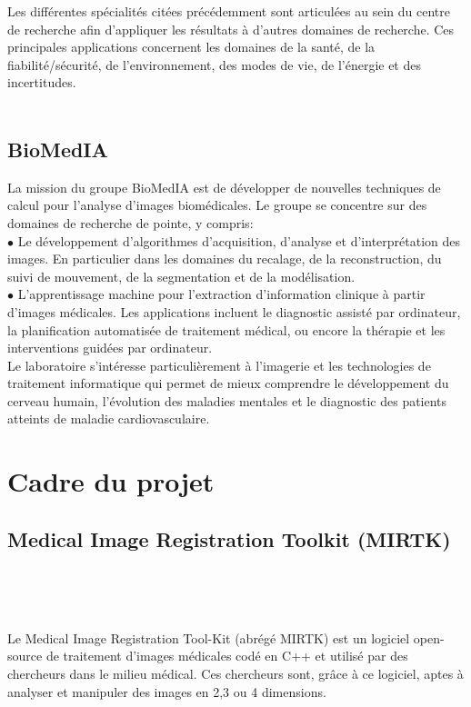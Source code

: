 \documentclass[10pt]{report}
\begin{document}
	Les différentes spécialités citées précédemment sont articulées au sein du centre de recherche afin d'appliquer les résultats à d'autres domaines de recherche. Ces principales applications concernent les domaines de la santé, de la fiabilité/sécurité, de l'environnement, des modes de vie, de l'énergie et des incertitudes.
	\\
	\\
	\subsection{BioMedIA}
	
	La mission du groupe BioMedIA est de développer de nouvelles techniques de
	calcul pour l'analyse d'images biomédicales. Le groupe se concentre sur des
	domaines de recherche de pointe, y compris:\\

	{$\bullet$} Le développement d'algorithmes d'acquisition, d'analyse et d'interprétation des images. En particulier dans les domaines du recalage, de la reconstruction,
	du suivi de mouvement, de la segmentation et de la modélisation. \\

	{$\bullet$} L'apprentissage machine pour l'extraction d'information clinique à partir
	d'images médicales. Les applications incluent le diagnostic assisté par
	ordinateur, la planification automatisée de traitement médical, ou encore la thérapie et les interventions guidées par ordinateur. \\

	Le laboratoire s'intéresse particulièrement à l'imagerie et les technologies de
	traitement informatique qui permet de mieux comprendre le
	développement du cerveau humain, l’évolution des maladies mentales et le
	diagnostic des patients atteints de maladie cardiovasculaire.
	
	
	\section{Cadre du projet} %
	\subsection{Medical Image Registration Toolkit (MIRTK)}~\par~\par
	Le Medical Image Registration Tool-Kit (abrégé MIRTK) est un logiciel open-source de traitement d'images médicales codé en C++ et utilisé par des chercheurs dans le milieu médical. Ces chercheurs sont, grâce à ce logiciel, aptes à analyser et manipuler des images en 2,3 ou 4 dimensions.   \\ 
	
\end{document}
